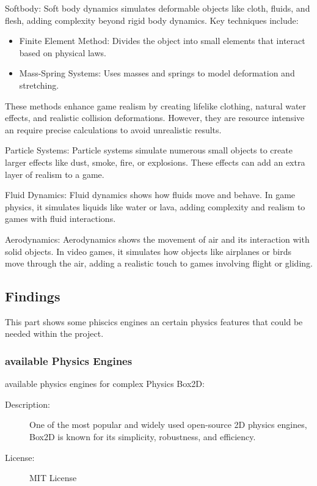 \documentclass{projdoc}
\begin{document}
Softbody:
Soft body dynamics simulates deformable objects like cloth, fluids, and flesh, adding complexity beyond rigid body dynamics. Key techniques include:
\begin{itemize}
	\item Finite Element Method: Divides the object into small elements that interact based on physical laws.
	\item Mass-Spring Systems: Uses masses and springs to model deformation and stretching.
\end{itemize}
These methods enhance game realism by creating lifelike clothing, natural water effects, and realistic collision deformations. However, they are resource intensive an require precise calculations to avoid unrealistic results.

Particle Systems:
Particle systems simulate numerous small objects to create larger effects like dust, smoke, fire, or explosions. These effects can add an extra layer of realism to a game.

Fluid Dynamics:
Fluid dynamics shows how fluids move and behave. In game physics, it simulates liquids like water or lava, adding complexity and realism to games with fluid interactions.

Aerodynamics:
Aerodynamics shows the movement of air and its interaction with solid objects. In video games, it simulates how objects like airplanes or birds move through the air, adding a realistic touch to games involving flight or gliding.


\subsection{Findings}

This part shows some phiscics engines an certain physics features that could be needed within the project.


\subsubsection{available Physics Engines}
available physics engines for complex Physics
Box2D:
\begin{description}
	\item[Description:] One of the most popular and widely used open-source 2D physics engines, Box2D is known for its simplicity, robustness, and efficiency.
	\item[License:] MIT License
\end{description}
\end{document}
